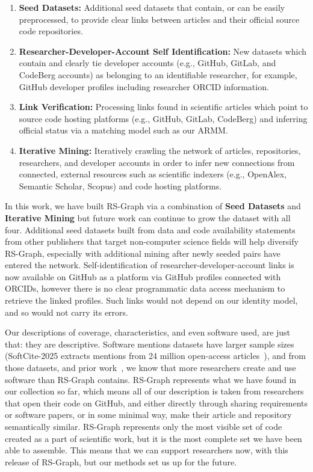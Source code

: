 \documentclass[pdflatex,sn-nature]{sn-jnl}%
\begin{document}
\begin{enumerate}
\item \textbf{Seed Datasets:} Additional seed datasets that contain, or can be easily preprocessed, to provide clear links between articles and their official source code repositories.
\item \textbf{Researcher-Developer-Account Self Identification:} New datasets which contain and clearly tie developer accounts (e.g., GitHub, GitLab, and CodeBerg accounts) as belonging to an identifiable researcher, for example, GitHub developer profiles including researcher ORCID information.
\item \textbf{Link Verification:} Processing links found in scientific articles which point to source code hosting platforms (e.g., GitHub, GitLab, CodeBerg) and inferring official status via a matching model such as our ARMM.
\item \textbf{Iterative Mining:} Iteratively crawling the network of articles, repositories, researchers, and developer accounts in order to infer new connections from connected, external resources such as scientific indexers (e.g., OpenAlex, Semantic Scholar, Scopus) and code hosting platforms.
\end{enumerate}

In this work, we have built RS-Graph via a combination of \textbf{Seed Datasets} and \textbf{Iterative Mining} but future work can continue to grow the dataset with all four. Additional seed datasets built from data and code availability statements from other publishers that target non-computer science fields will help diversify RS-Graph, especially with additional mining after newly seeded pairs have entered the network. Self-identification of researcher-developer-account links is now available on GitHub as a platform via GitHub profiles connected with ORCIDs, however there is no clear programmatic data access mechanism to retrieve the linked profiles. Such links would not depend on our identity model, and so would not carry its errors.

Our descriptions of coverage, characteristics, and even software used, are just that: they are descriptive. Software mentions datasets have larger sample sizes (SoftCite-2025 extracts mentions from 24 million open-access articles~\cite{howison_2025_15149379}), and from those datasets, and prior work~\cite{hannay2009scientists}, we know that more researchers create and use software than RS-Graph contains. RS-Graph represents what we have found in our collection so far, which means all of our description is taken from researchers that open their code on GitHub, and either directly through sharing requirements or software papers, or in some minimal way, make their article and repository semantically similar. RS-Graph represents only the most visible set of code created as a part of scientific work, but it is the most complete set we have been able to assemble. This means that we can support researchers now, with this release of RS-Graph, but our methods set us up for the future.
\end{document}
